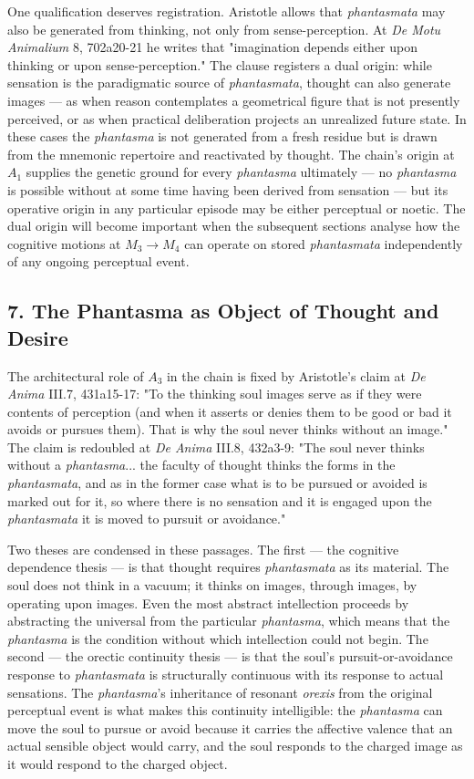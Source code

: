 \documentclass[12pt]{article}
\begin{document}
One qualification deserves registration. Aristotle allows that \textit{phantasmata} may also be generated from thinking, not only from sense-perception. At \textit{De Motu Animalium} 8, 702a20-21 he writes that "imagination depends either upon thinking or upon sense-perception." The clause registers a dual origin: while sensation is the paradigmatic source of \textit{phantasmata}, thought can also generate images --- as when reason contemplates a geometrical figure that is not presently perceived, or as when practical deliberation projects an unrealized future state. In these cases the \textit{phantasma} is not generated from a fresh residue but is drawn from the mnemonic repertoire and reactivated by thought. The chain's origin at $A_1$ supplies the genetic ground for every \textit{phantasma} ultimately --- no \textit{phantasma} is possible without at some time having been derived from sensation --- but its operative origin in any particular episode may be either perceptual or noetic. The dual origin will become important when the subsequent sections analyse how the cognitive motions at $M_3$$\to$$M_4$ can operate on stored \textit{phantasmata} independently of any ongoing perceptual event.

\subsection*{7. The Phantasma as Object of Thought and Desire}

The architectural role of $A_3$ in the chain is fixed by Aristotle's claim at \textit{De Anima} III.7, 431a15-17: "To the thinking soul images serve as if they were contents of perception (and when it asserts or denies them to be good or bad it avoids or pursues them). That is why the soul never thinks without an image." The claim is redoubled at \textit{De Anima} III.8, 432a3-9: "The soul never thinks without a \textit{phantasma}... the faculty of thought thinks the forms in the \textit{phantasmata}, and as in the former case what is to be pursued or avoided is marked out for it, so where there is no sensation and it is engaged upon the \textit{phantasmata} it is moved to pursuit or avoidance."

Two theses are condensed in these passages. The first --- the cognitive dependence thesis --- is that thought requires \textit{phantasmata} as its material. The soul does not think in a vacuum; it thinks on images, through images, by operating upon images. Even the most abstract intellection proceeds by abstracting the universal from the particular \textit{phantasma}, which means that the \textit{phantasma} is the condition without which intellection could not begin. The second --- the orectic continuity thesis --- is that the soul's pursuit-or-avoidance response to \textit{phantasmata} is structurally continuous with its response to actual sensations. The \textit{phantasma}'s inheritance of resonant \textit{orexis} from the original perceptual event is what makes this continuity intelligible: the \textit{phantasma} can move the soul to pursue or avoid because it carries the affective valence that an actual sensible object would carry, and the soul responds to the charged image as it would respond to the charged object.
\end{document}
